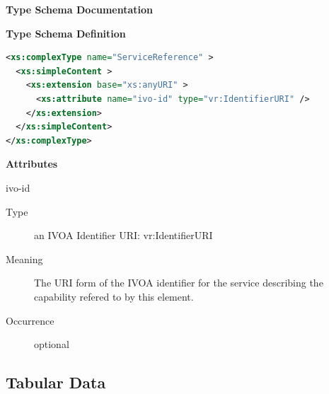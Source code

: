 \documentclass[11pt,a4paper]{ivoa}
\begin{document}
\begin{generated}
\begingroup
      	\renewcommand*\descriptionlabel[1]{%
      	\hbox to 5.5em{\emph{#1}\hfil}}\vspace{2ex}\noindent\textbf{ Type Schema Documentation}


\vspace{1ex}\noindent\textbf{ Type Schema Definition}

\begin{lstlisting}[language=XML,basicstyle=\footnotesize]
<xs:complexType name="ServiceReference" >
  <xs:simpleContent >
    <xs:extension base="xs:anyURI" >
      <xs:attribute name="ivo-id" type="vr:IdentifierURI" />
    </xs:extension>
  </xs:simpleContent>
</xs:complexType>
\end{lstlisting}

\vspace{0.5ex}\noindent\textbf{ Attributes}

\begingroup\small\begin{bigdescription}
\item[ivo-id]
\begin{description}
\item[Type] an IVOA Identifier URI: vr:IdentifierURI
\item[Meaning] 
                   The URI form of the IVOA identifier for the service 
                   describing the capability refered to by this element.
                 
\item[Occurrence] optional
\end{description}


\end{bigdescription}\endgroup

\endgroup
\end{generated}



\subsection{Tabular Data}
\label{sect:table}
\end{document}
